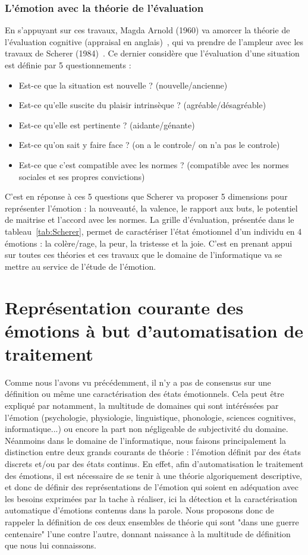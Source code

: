 \subsubsection{L'émotion avec la théorie de l'évaluation}
En s'appuyant sur ces travaux, Magda Arnold (1960) va amorcer la théorie de l'évaluation cognitive (appraisal en anglais)~\cite{Arnold1960}, qui va prendre de l'ampleur avec les travaux de Scherer (1984)~\cite{Scherer1984}. Ce dernier considère que l'évaluation d'une situation est définie par 5 questionnements :
\begin{itemize}
  \item Est-ce que la situation est nouvelle ? (nouvelle/ancienne)
  \item Est-ce qu'elle suscite du plaisir intrinsèque ? (agréable/désagréable)
  \item Est-ce qu'elle est pertinente ? (aidante/génante)
  \item Est-ce qu'on sait y faire face ? (on a le controle/ on n'a pas le controle)
  \item Est-ce que c'est compatible avec les normes ? (compatible avec les normes sociales et ses propres convictions)
\end{itemize}

C'est en réponse à ces 5 questions que Scherer va proposer 5 dimensions pour représenter l'émotion : la nouveauté, la valence, le rapport aux buts, le potentiel de maitrise et l'accord avec les normes. La grille d'évaluation, présentée dans le tableau~\ref{tab:Scherer}, permet de caractériser l'état émotionnel d'un individu en 4 émotions : la colère/rage, la peur, la tristesse et la joie.
C'est en prenant appui sur toutes ces théories et ces travaux que le domaine de l'informatique va se mettre au service de l'étude de l'émotion.



\section{Représentation courante des émotions à but d'automatisation de traitement}
Comme nous l'avons vu précédemment, il n'y a pas de consensus sur une définition ou même une caractérisation des états émotionnels. Cela peut être expliqué par notamment, la multitude de domaines qui sont intéréssées par l'émotion (psychologie, physiologie, linguistique, phonologie, sciences cognitives, informatique...) ou encore la part non négligeable de subjectivité du domaine.
Néanmoins dans le domaine de l'informatique, nous faisons principalement la distinction entre deux grands courants de théorie : l'émotion définit par des états discrets et/ou par des états continus. En effet, afin d'automatisation le traitement des émotions, il est nécessaire de se tenir à une théorie algoriquement descriptive, et donc de définir des représentations de l'émotion qui soient en adéquation avec les besoins exprimées par la tache à réaliser, ici la détection et la caractérisation automatique d'émotions contenus dans la parole. Nous proposons donc de rappeler la définition de ces deux ensembles de théorie qui sont "dans une guerre centenaire" l'une contre l'autre, donnant naissance à la multitude de définition que nous lui connaissons.

